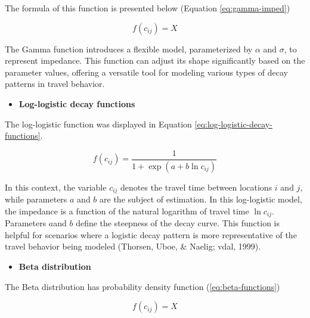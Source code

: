 \documentclass[
11pt, %
oneside, %
english, %
singlespacing, %
]{macthesis} %
\def\tightlist{}
\begin{document}
The formula of this function is presented below (Equation \ref{eq:gamma-imped})

\begin{equation}
f(c_{ij}) = X
\label{eq:gamma-imped}
\end{equation}

The Gamma function introduces a flexible model, parameterized by \(\alpha\) and \(\sigma\), to represent impedance. This function can adjust its shape significantly based on the parameter values, offering a versatile tool for modeling various types of decay patterns in travel behavior.

\begin{itemize}
\tightlist
\item
  \textbf{Log-logistic decay functions}
\end{itemize}

The log-logistic function was displayed in Equation \ref{eq:log-logistic-decay-functions}.

\begin{equation}
f(c_{ij}) = \frac {1}{1+ \exp(a + b\ln c_{ij})}
\label{eq:log-logistic-decay-functions}
\end{equation}

In this context, the variable \(c_{ij}\) denotes the travel time between locations \(i\) and \(j\), while parameters \(a\) and \(b\) are the subject of estimation. In this log-logistic model, the impedance is a function of the natural logarithm of travel time \(\ln c_{ij}\). Parameters \(a\)and \(b\) define the steepness of the decay curve. This function is helpful for scenarios where a logistic decay pattern is more representative of the travel behavior being modeled (Thorsen, Uboe, \& Naelig; vdal, 1999).

\begin{itemize}
\tightlist
\item
  \textbf{Beta distribution}
\end{itemize}

The Beta distribution has probability density function (\ref{eq:beta-functions})

\begin{equation}
f(c_{ij}) = X
\label{eq:beta-functions}
\end{equation}
\end{document}
